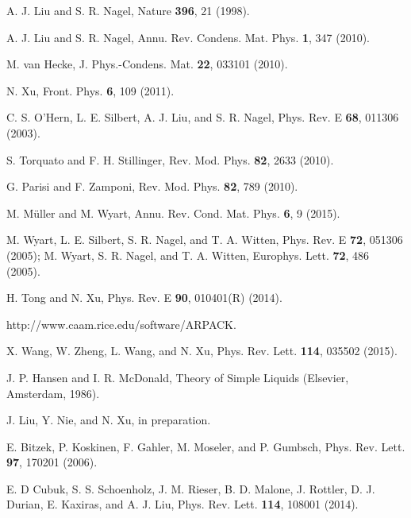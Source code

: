 \documentclass[twocolumn,printnumbers,amsmath,amssymb,prl,verbatim]{revtex4}
\begin{document}
\begin{thebibliography}{50}
 A. J. Liu and S. R. Nagel, Nature {\bf 396}, 21 (1998).

 A. J. Liu and S. R. Nagel, Annu. Rev. Condens. Mat. Phys. {\bf 1}, 347 (2010).

 M. van Hecke, J. Phys.-Condens. Mat. {\bf 22}, 033101 (2010).

 N. Xu, Front. Phys. {\bf 6}, 109 (2011).

 C. S. O'Hern, L. E. Silbert, A. J. Liu, and S. R. Nagel, Phys. Rev. E {\bf 68}, 011306 (2003).

 S. Torquato and F. H. Stillinger, Rev. Mod. Phys. {\bf 82}, 2633 (2010).

 G. Parisi and F. Zamponi, Rev. Mod. Phys. {\bf 82}, 789 (2010).

 M. M\"uller and M. Wyart, Annu. Rev. Cond. Mat. Phys. {\bf 6}, 9 (2015).

 M. Wyart, L. E. Silbert, S. R. Nagel, and T. A. Witten, Phys. Rev. E {\bf 72}, 051306 (2005); M. Wyart, S. R. Nagel, and T. A. Witten, Europhys. Lett. {\bf 72}, 486 (2005).

 H. Tong and N. Xu, Phys. Rev. E {\bf 90}, 010401(R) (2014).

 http://www.caam.rice.edu/software/ARPACK.

 X. Wang, W. Zheng, L. Wang, and N. Xu, Phys. Rev. Lett. {\bf 114}, 035502 (2015).

 J. P. Hansen and I. R. McDonald, Theory of Simple Liquids (Elsevier, Amsterdam, 1986).

 J. Liu, Y. Nie, and N. Xu, in preparation.

 E. Bitzek, P. Koskinen, F. Gahler, M. Moseler, and P. Gumbsch, Phys. Rev. Lett. {\bf 97}, 170201 (2006).

 E. D Cubuk, S. S. Schoenholz, J. M. Rieser, B. D. Malone, J. Rottler, D. J. Durian, E. Kaxiras, and A. J. Liu, Phys. Rev. Lett. {\bf 114}, 108001 (2014).
















\end{thebibliography}
\end{document}
